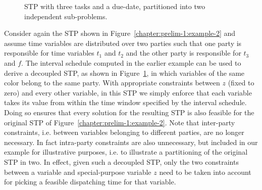 	\begin{figure}
		\centering
		\caption{STP with three tasks and a due-date, partitioned into two independent sub-problems.}
		\label{chapter:prelim-1:example-3}
	\end{figure}
	

	\begin{example}
		Consider again the STP shown in Figure~\ref{chapter:prelim-1:example-2} and
		assume time variables are distributed over two parties such that one party is responsible for time variables $t_1$ and $t_2$ and the other party is responsible for $t_3$ and $f$.
		The interval schedule computed in the earlier example can be used to derive a decoupled STP, as shown in Figure~\ref{chapter:prelim-1:example-3},
		in which variables of the same color belong to the same party.
		With appropriate constraints between $z$ (fixed to zero) and every other variable,
		in this STP we simply enforce that each variable takes its value from within the time window specified by the interval schedule.
		Doing so ensures that every solution for the resulting STP is also feasible for the original STP of Figure~\ref{chapter:prelim-1:example-2}.
		Note that inter-party constraints, i.e. between variables belonging to different parties, are no longer necessary.
		In fact intra-party constraints are also unnecessary, but included in our example for illustrative purposes,
		i.e. to illustrate a partitioning of the original STP in two.
		In effect, given such a decoupled STP, only the two constraints between a variable and special-purpose variable $z$
		need to be taken into account for picking a feasible dispatching time for that variable. 
	\end{example}

